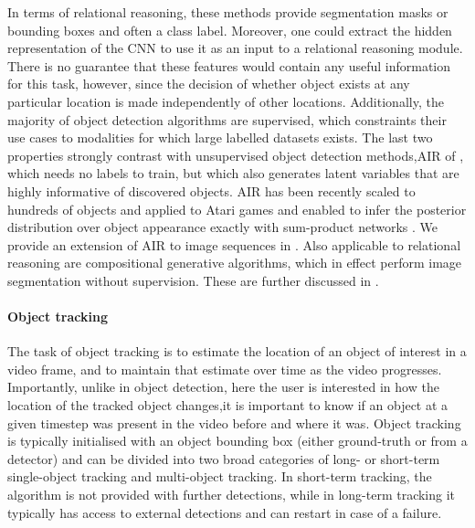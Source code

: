 	In terms of relational reasoning, these methods provide segmentation masks or bounding boxes and often a class label.
	Moreover, one could extract the hidden representation of the \gls{CNN} to use it as an input to a relational reasoning module.
	There is no guarantee that these features would contain any useful information for this task, however, since the decision of whether object exists at any particular location is made independently of other locations.
	Additionally, the majority of object detection algorithms are supervised, which constraints their use cases to modalities for which large labelled datasets exists.
	The last two properties strongly contrast with unsupervised object detection methods,\eg \gls{AIR} of \cite{Eslami2016air}, which needs no labels to train, but which also generates latent variables that are highly informative of discovered objects.
	\gls{AIR} has been recently scaled to hundreds of objects and applied to Atari games \citep{Crawford2019spair} and enabled to infer the posterior distribution over object appearance exactly with sum-product networks \citep{Stelzner2019supair}.
	We provide an extension of \gls{AIR} to image sequences in .
	Also applicable to relational reasoning are compositional generative algorithms, which in effect perform image segmentation without supervision.
	These are further discussed in .
	
	\paragraph{Object tracking}
	The task of object tracking is to estimate the location of an object of interest in a video frame, and to maintain that estimate over time as the video progresses.
	Importantly, unlike in object detection, here the user is interested in how the location of the tracked object changes,\ie it is important to know if an object at a given timestep was present in the video before and where it was.
	Object tracking is typically initialised with an object bounding box (either ground-truth or from a detector) and can be divided into two broad categories of long- or short-term single-object tracking and multi-object tracking.
	In short-term tracking, the algorithm is not provided with further detections, while in long-term tracking it typically has access to external detections and can restart in case of a failure.
	
